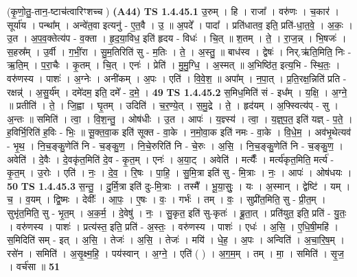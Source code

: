 \documentclass[17pt]{extarticle}
\begin{document}
                  \newline
                      (कृ॒णो॒तु॒-तान॒-ष्टाच॑त्वारिꣳशच्च )  \textbf{(A44)} \newline \newline
                                \textbf{ TS 1.4.45.1} \newline
                  उ॒रुम् । हि । राजा᳚ । वरु॑णः । च॒कार॑ । सूर्या॑य । पन्था᳚म् । अन्वे॑त॒वा इत्यनु॑ - ए॒त॒वै । उ॒ ॥ अ॒पदे᳚ । पादा᳚ । प्रति॑धातव॒ इति॒ प्रति॑-धा॒त॒वे॒ । अ॒कः॒ । उ॒त । अ॒प॒व॒क्तेत्य॑प - व॒क्ता । हृ॒द॒या॒विध॒ इति॑ हृदय - विधः॑ । चि॒त् ॥ श॒तम् । ते॒ । रा॒ज॒न्न् । भि॒षजः॑ । स॒हस्र᳚म् । उ॒र्वी । ग॒भीं॒रा । सु॒म॒तिरिति॑ सु - म॒तिः । ते॒ । अ॒स्तु॒ ॥ बाध॑स्व । द्वेषः॑ । निर्.ऋ॑ति॒मिति॒ निः - ऋ॒ति॒म् । प॒रा॒चैः । कृ॒तम् । चि॒त् । एनः॑ । प्रेति॑ । मु॒मु॒ग्धि॒ । अ॒स्मत् ॥ अ॒भिष्ठि॑त॒ इत्य॒भि - स्थि॒तः॒ । वरु॑णस्य । पाशः॑ । अ॒ग्नेः । अनी॑कम् । अ॒पः । एति॑ । वि॒वे॒श॒ ॥ अपा᳚म् । न॒पा॒त् । प्र॒ति॒रक्ष॒न्निति॑ प्रति - रक्षन्न्॑ । अ॒सु॒र्य᳚म् । दमे॑दम॒ इति॒ दमे᳚ - द॒मे॒ । \textbf{  49} \newline
                  \newline
                                \textbf{ TS 1.4.45.2} \newline
                  स॒मिध॒मिति॑ सं - इध᳚म् । य॒क्षि॒ । अ॒ग्ने॒ ॥ प्रतीति॑ । ते॒ । जि॒ह्वा । घृ॒तम् । उदिति॑ । च॒र॒ण्ये॒त् । स॒मु॒द्रे । ते॒ । हृद॑यम् । अ॒फ्स्वित्य॑प् - सु । अ॒न्तः ॥ समिति॑ । त्वा॒ । वि॒श॒न्तु॒ । ओष॑धीः । उ॒त । आपः॑ । य॒ज्ञ्स्य॑ । त्वा॒ । य॒ज्ञ्॒प॒त॒ इति॑ यज्ञ् - प॒ते॒ । ह॒विर्भि॒रिति॑ ह॒विः - भिः॒ ॥ सू॒क्त॒वा॒क इति॑ सूक्त - वा॒के । न॒मो॒वा॒क इति॑ नमः - वा॒के । वि॒धे॒म॒ । अव॑भृ॒थेत्यव॑ - भृ॒थ॒ । नि॒च॒ङ्कु॒णेति॑ नि - च॒ङ्कु॒ण॒ । नि॒चे॒रुरिति॑ नि - चे॒रुः । अ॒सि॒ । नि॒च॒ङ्कु॒णेति॑ नि - च॒ङ्कु॒ण॒ । अवेति॑ । दे॒वैः । दे॒वकृ॑त॒मिति॑ दे॒व - कृ॒त॒म् । एनः॑ । अ॒या॒ट् । अवेति॑ । मर्त्यैः᳚ । मर्त्य॑कृत॒मिति॒ मर्त्य॑ - कृ॒त॒म् । उ॒रोः । एति॑ । नः॒ । दे॒व॒ । रि॒षः । पा॒हि॒ । सु॒मि॒त्रा इति॑ सु - मि॒त्राः । नः॒ । आपः॑ । ओष॑धयः । \textbf{  50} \newline
                  \newline
                                \textbf{ TS 1.4.45.3} \newline
                  स॒न्तु॒ । दु॒र्मि॒त्रा इति॑ दुः-मि॒त्राः । तस्मै᳚ । भू॒या॒सुः॒ । यः । अ॒स्मान् । द्वेष्टि॑ । यम् । च॒ । व॒यम् । द्वि॒ष्मः । देवीः᳚ । आ॒पः॒ । ए॒षः । वः॒ । गर्भः॑ । तम् । वः॒ । सुप्री॑त॒मिति॒ सु - प्री॒त॒म् । सुभृ॑त॒मिति॒ सु - भृ॒त॒म् । अ॒क॒र्म॒ । दे॒वेषु॑ । नः॒ । सु॒कृत॒ इति॑ सु-कृतः॑ । ब्रू॒ता॒त् । प्रति॑युत॒ इति॒ प्रति॑ - यु॒तः॒ । वरु॑णस्य । पाशः॑ । प्रत्य॑स्त॒ इति॒ प्रति॑ - अ॒स्तः॒ । वरु॑णस्य । पाशः॑ । एधः॑ । अ॒सि॒ । ए॒धि॒षी॒महि॑ । स॒मिदिति॑ सम् - इत् । अ॒सि॒ । तेजः॑ । अ॒सि॒ । तेजः॑ । मयि॑ । धे॒ह॒ । अ॒पः । अन्विति॑ । अ॒चा॒रि॒ष॒म् । रसे॑न । समिति॑ । अ॒सृ॒क्ष्म॒हि॒ । पय॑स्वान् । अ॒ग्ने॒ । एति॑ ( ) । अ॒ग॒म॒म् । तम् । मा॒ । समिति॑ । सृ॒ज॒ । वर्च॑सा ॥ \textbf{  51} \newline
\end{document}
